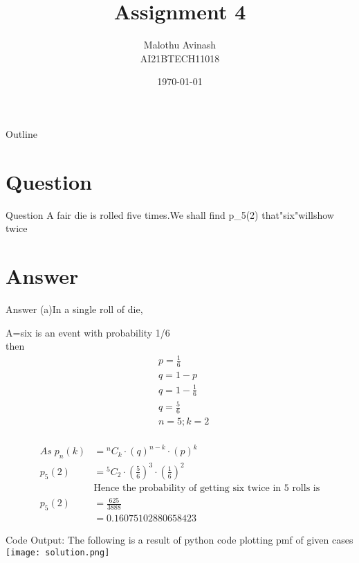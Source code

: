 \documentclass{beamer}
\title{Assignment 4}%
\author{Malothu Avinash \\ AI21BTECH11018}
\date{\today}
\begin{document}
\begin{frame}
    \titlepage 
\end{frame}



\begin{frame}{Outline}
    \tableofcontents
\end{frame}


\section{Question}
\begin{frame}{Question}
A fair die is rolled five times.We shall find p_5(2)\; that\;"six"\;will\;show\; twice
\end{frame}

\section{Answer}
\begin{frame}{Answer}
(a)In a single roll of die,
  
  A={six} is an event with probability 1/6 
  \\
  then
  \begin{align}
      &p=\frac{1}{6}\\
      &q=1-p\\
      &q=1-\frac{1}{6}\\
      &q=\frac{5}{6}\\
      &n=5;k=2\\
  \end{align}
\end{frame}
\begin{frame}
\begin{align}
     As\;p_n(k)&={}^{n}C_{k}\cdot (q)^{n-k} \cdot (p)^k\\
     p_5(2)&={}^{5}C_{2}\cdot (\frac{5}{6})^{3} \cdot (\frac{1}{6})^2
   \\&\text{Hence the probability of getting six twice in 5 rolls is}\\
     p_5(2)&=\frac{625}{3888}\\
     &=0.16075102880658423
\end{align}
\end{frame}
\begin{frame}{Code Output:}
The following is a result of python code plotting pmf of given cases
\texttt{[image: solution.png]}
\end{frame}
\end{document}
